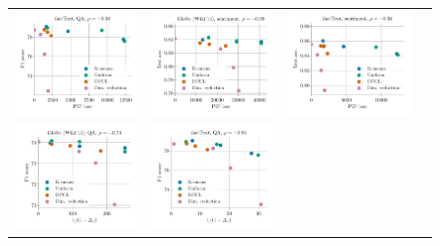 \begin{figure}
\begin{tabular}{@{\hskip -0.0in}c@{\hskip -0.0in}c@{\hskip -0.0in}c@{\hskip -0.0in}c@{\hskip -0.0in}}
		\includegraphics[width=.245\linewidth]{figures/fasttext1m_qa_best-f1_vs_gram-large-dim-frob-error_linx_det_ave-pt.pdf} &
		\includegraphics[width=.245\linewidth]{figures/glove400k_sentiment_sst_test-acc_vs_gram-large-dim-frob-error_linx_det_ave-pt.pdf} &
		\includegraphics[width=.245\linewidth]{figures/fasttext1m_sentiment_sst_test-acc_vs_gram-large-dim-frob-error_linx_det_ave-pt.pdf} \\
		\includegraphics[width=.245\linewidth]{figures/glove400k_qa_best-f1_vs_gram-large-dim-delta1-2-trans_linx_det_ave-pt.pdf} &
		\includegraphics[width=.245\linewidth]{figures/fasttext1m_qa_best-f1_vs_gram-large-dim-delta1-2-trans_linx_det_ave-pt.pdf} &

\end{tabular}
\end{figure}
